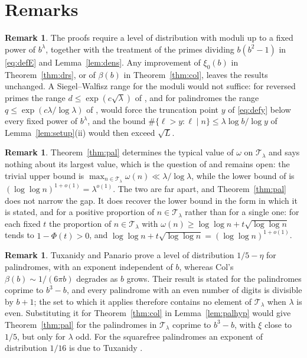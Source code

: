 \documentclass[11pt,a4paper]{article}
\theoremstyle{plain}
\theoremstyle{definition}
\newtheorem{remark}[theorem]{Remark}
\numberwithin{equation}{section}
\begin{document}
\section{Remarks}\label{sec:remarks}

\begin{remark}\label{rem:inputs}
The proofs require a level of distribution with moduli up to a fixed power of $b^{\lambda}$, together with
the treatment of the primes dividing $b(b^{2}-1)$ in \eqref{eq:defE} and Lemma~\ref{lem:dens}. Any
improvement of $\xi_0(b)$ in Theorem~\ref{thm:drs}, or of $\beta(b)$ in Theorem~\ref{thm:col}, leaves the
results unchanged. A Siegel--Walfisz range for the moduli would not suffice: for reversed primes the range
$d\le\exp(c\sqrt\lambda)$ of \cite{BS1,BS2}, and for palindromes the range
$q\le\exp(c\lambda/\log\lambda)$ of \cite[Thm.~1]{Col}, would force the truncation point $y$ of
\eqref{eq:defy} below every fixed power of $b^{\lambda}$, and the bound
$\#\{\ell>y:\ell\mid n\}\le\lambda\log b/\log y$ of Lemma~\ref{lem:setup}(ii) would then exceed
$\sqrt{L}$.
\end{remark}

\begin{remark}\label{rem:extremal}
Theorem~\ref{thm:pal} determines the typical value of $\omega$ on $\mathcal T_\lambda$ and says nothing
about its largest value, which is the question of \cite{BSh} and remains open: the trivial upper bound is
$\max_{n\in\mathcal T_\lambda}\omega(n)\ll\lambda/\log\lambda$, while the lower bound of \cite{BSh} is
$(\log\log n)^{1+o(1)}=\lambda^{o(1)}$. The two are far apart, and Theorem~\ref{thm:pal} does not narrow
the gap. It does recover the lower bound in the form in which it is stated, and for a positive proportion
of $n\in\mathcal T_\lambda$ rather than for a single one: for each fixed $t$ the proportion of
$n\in\mathcal T_\lambda$ with $\omega(n)\ge\log\log n+t\sqrt{\log\log n}$ tends to $1-\Phi(t)>0$, and
$\log\log n+t\sqrt{\log\log n}=(\log\log n)^{1+o(1)}$.
\end{remark}

\begin{remark}\label{rem:paldist}
Tuxanidy and Panario \cite[Thm.~1.5]{TP} prove a level of distribution $1/5-\eta$ for palindromes, with an
exponent independent of $b$, whereas Col's $\beta(b)\sim1/(6\pi b)$ degrades as $b$ grows. Their result is
stated for the palindromes coprime to $b^{3}-b$, and every palindrome with an even number of digits is
divisible by $b+1$; the set to which it applies therefore contains no element of $\mathcal T_\lambda$ when
$\lambda$ is even. Substituting it for Theorem~\ref{thm:col} in Lemma~\ref{lem:palhyp} would give
Theorem~\ref{thm:pal} for the palindromes in $\mathcal T_\lambda$ coprime to $b^{3}-b$, with $\xi$ close
to $1/5$, but only for $\lambda$ odd. For the squarefree palindromes an exponent of distribution $1/16$
is due to Tuxanidy \cite{Tux}.
\end{remark}
\end{document}
